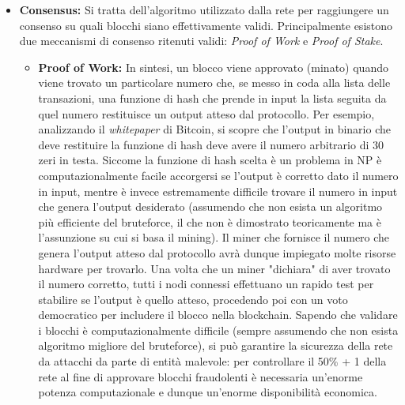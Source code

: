 \documentclass[a4paper, 12pt]{article}
\begin{document}
\begin{itemize}

\item \textbf{Consensus: }
Si tratta dell'algoritmo utilizzato dalla rete per raggiungere un consenso su quali blocchi siano effettivamente validi.
Principalmente esistono due meccanismi di consenso ritenuti validi: \textit{Proof of Work} e \textit{Proof of Stake}.

\begin{itemize}
    \item \textbf{Proof of Work: }
    In sintesi, un blocco viene approvato (minato) quando viene trovato un particolare numero che, se messo in coda alla lista delle transazioni, una funzione di hash che prende
    in input la lista seguita da quel numero restituisce un output atteso dal protocollo. Per esempio, analizzando il \textit{whitepaper} di Bitcoin, si scopre che
    l'output in binario che deve restituire la funzione di hash deve avere il numero arbitrario di 30 zeri in testa.
    Siccome la funzione di hash scelta è un problema in NP è computazionalmente facile accorgersi se l'output è corretto dato il numero in input, mentre è invece estremamente difficile
    trovare il numero in input che genera l'output desiderato (assumendo che non esista un algoritmo più efficiente del bruteforce, il che non è dimostrato teoricamente ma è l'assunzione su cui si basa il mining). Il miner che fornisce il numero che genera l'output atteso dal protocollo
    avrà dunque impiegato molte risorse hardware per trovarlo.
    Una volta che un miner "dichiara" di aver trovato il numero corretto, tutti i nodi connessi effettuano un rapido test per stabilire se l'output è quello atteso, procedendo
    poi con un voto democratico per includere il blocco nella blockchain.
    Sapendo che validare i blocchi è computazionalmente difficile (sempre assumendo che non esista algoritmo migliore del bruteforce), si può garantire la sicurezza della rete da attacchi da parte di entità malevole: per controllare il 50\% + 1 della
    rete al fine di approvare blocchi fraudolenti è necessaria un'enorme potenza computazionale e dunque un'enorme disponibilità economica.\\


\end{itemize}
\end{itemize}
\end{document}
